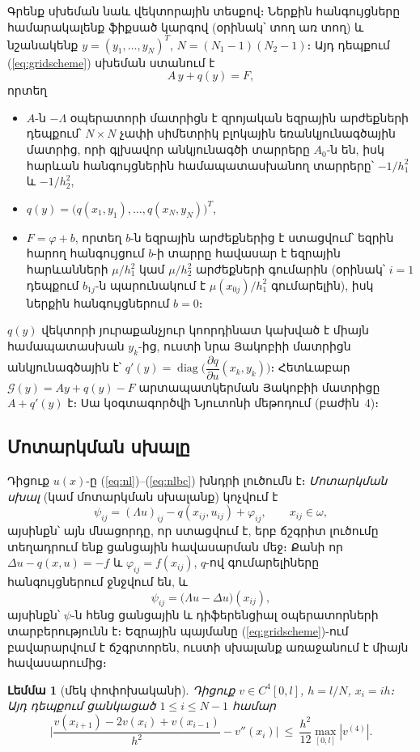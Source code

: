 \documentclass[12pt,a4paper]{article}
\theoremstyle{arm}
\newtheorem{lemma}{Լեմմա}
\theoremstyle{armdef}
\numberwithin{equation}{section}
\newcommand{\dd}[2]{\dfrac{\partial #1}{\partial #2}}
\begin{document}
Գրենք սխեման նաև վեկտորային տեսքով։ Ներքին հանգույցները համարակալենք ֆիքսած կարգով (օրինակ՝ տող առ տող) և նշանակենք $y=(y_1,\dots,y_N)^{T}$, $N=(N_1-1)(N_2-1)$։ Այդ դեպքում (\ref{eq:gridscheme}) սխեման ստանում է
\begin{equation}\label{eq:matrix}
A\,y+q(y)=F,
\end{equation}
որտեղ
\begin{itemize}
\item $A$-ն $-\Lambda$ օպերատորի մատրիցն է զրոյական եզրային արժեքների դեպքում՝ $N\times N$ չափի սիմետրիկ բլոկային եռանկյունագծային մատրից, որի գլխավոր անկյունագծի տարրերը $A_0$-ն են, իսկ հարևան հանգույցներին համապատասխանող տարրերը՝ $-1/h_1^2$ և $-1/h_2^2$,
\item $q(y)=\big(q(x_1,y_1),\dots,q(x_N,y_N)\big)^{T}$,
\item $F=\varphi+b$, որտեղ $b$-ն եզրային արժեքներից է ստացվում՝ եզրին հարող հանգույցում $b$-ի տարրը հավասար է եզրային հարևանների $\mu/h_1^2$ կամ $\mu/h_2^2$ արժեքների գումարին (օրինակ՝ $i=1$ դեպքում $b_{1j}$-ն պարունակում է $\mu(x_{0j})/h_1^2$ գումարելին), իսկ ներքին հանգույցներում $b=0$։
\end{itemize}
$q(y)$ վեկտորի յուրաքանչյուր կոորդինատ կախված է միայն համապատասխան $y_k$-ից, ուստի նրա Յակոբիի մատրիցն անկյունագծային է՝ $q'(y)=\operatorname{diag}\big(\dd{q}{u}(x_k,y_k)\big)$։ Հետևաբար $\mathcal G(y)=Ay+q(y)-F$ արտապատկերման Յակոբիի մատրիցը $A+q'(y)$ է։ Սա կօգտագործվի Նյուտոնի մեթոդում (բաժին~4)։

\subsection{Մոտարկման սխալը}

Դիցուք $u(x)$-ը (\ref{eq:nl})--(\ref{eq:nlbc}) խնդրի լուծումն է։ \emph{Մոտարկման սխալ} (կամ մոտարկման սխալանք) կոչվում է
\[\psi_{ij}=(\Lambda u)_{ij}-q(x_{ij},u_{ij})+\varphi_{ij},\qquad x_{ij}\in\omega,\]
այսինքն՝ այն մնացորդը, որ ստացվում է, երբ ճշգրիտ լուծումը տեղադրում ենք ցանցային հավասարման մեջ։ Քանի որ $\Delta u-q(x,u)=-f$ և $\varphi_{ij}=f(x_{ij})$, $q$-ով գումարելիները հանգույցներում ջնջվում են, և
\begin{equation}\label{eq:psi}
\psi_{ij}=\big(\Lambda u-\Delta u\big)(x_{ij}),
\end{equation}
այսինքն՝ $\psi$-ն հենց ցանցային և դիֆերենցիալ օպերատորների տարբերությունն է։ Եզրային պայմանը (\ref{eq:gridscheme})-ում բավարարվում է ճշգրտորեն, ուստի սխալանք առաջանում է միայն հավասարումից։

\begin{lemma}[մեկ փոփոխականի]\label{lem:1d}
Դիցուք $v\in C^4[0,l]$, $h=l/N$, $x_i=ih$։ Այդ դեպքում ցանկացած $1\le i\le N-1$ համար
\[\Big|\frac{v(x_{i+1})-2v(x_i)+v(x_{i-1})}{h^2}-v''(x_i)\Big|\ \le\ \frac{h^2}{12}\max_{[0,l]}|v^{(4)}|.\]
\end{lemma}
\end{document}
